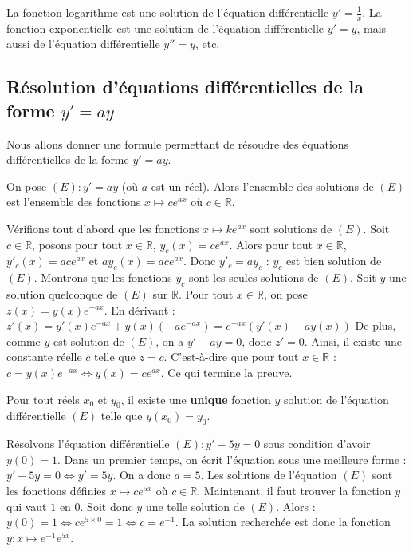 	\begin{tip}[Exemple]
		La fonction logarithme est une solution de l'équation différentielle $y' = \frac{1}{x}$.
		\newpar
		La fonction exponentielle est une solution de l'équation différentielle $y' = y$, mais aussi de l'équation différentielle $y'' = y$, etc.
	\end{tip}

	\subsection{Résolution d'équations différentielles de la forme $y'=ay$}

	Nous allons donner une formule permettant de résoudre des équations différentielles de la forme $y' = ay$.

	\begin{formula}[Formule]
		On pose $(E) : y'=ay$ (où $a$ est un réel). Alors l'ensemble des solutions de $(E)$ est l'ensemble des fonctions $x \mapsto c e^{ax}$ où $c \in \mathbb{R}$.
	\end{formula}

	\begin{demonstration}
		Vérifions tout d'abord que les fonctions $x \mapsto k e^{ax}$ sont solutions de $(E)$. Soit $c \in \mathbb{R}$, posons pour tout $x \in \mathbb{R}$, $y_c(x) = c e^{ax}$.
		\newpar
		Alors pour tout $x \in \mathbb{R}$, $y'_c(x) = ac e^{ax}$ et $ay_c(x) = ac e^{ax}$. Donc $y'_c = a y_c$ : $y_c$ est bien solution de $(E)$.
		\newpar
		Montrons que les fonctions $y_c$ sont les seules solutions de $(E)$. Soit $y$ une solution quelconque de $(E)$ sur $\mathbb{R}$. Pour tout $x \in \mathbb{R}$, on pose $z(x) = y(x) e^{-ax}$. En dérivant :
		\newpar
		$z'(x) = y'(x) e^{-ax} + y(x) (-ae^{-ax}) = e^{-ax}(y'(x) - ay(x))$
		\newpar
		De plus, comme $y$ est solution de $(E)$, on a $y' - ay = 0$, donc $z' = 0$.
		\newpar
		Ainsi, il existe une constante réelle $c$ telle que $z = c$. C'est-à-dire que pour tout $x \in \mathbb{R}$ :
		\newpar
		$c = y(x) e^{-ax} \iff y(x) = c e^{ax}$. Ce qui termine la preuve.
	\end{demonstration}

	\begin{formula}[Théorème]
		Pour tout réels $x_0$ et $y_0$, il existe une \textbf{unique} fonction $y$ solution de l'équation différentielle $(E)$ telle que $y(x_0) = y_0$.
	\end{formula}

	\begin{tip}[Exemple]
		Résolvons l'équation différentielle $(E) : y' - 5y = 0$ sous condition d'avoir $y(0) = 1$.
		\newpar
		Dans un premier temps, on écrit l'équation sous une meilleure forme : $y' - 5y = 0 \iff y' = 5y$. On a donc $a = 5$. Les solutions de l'équation $(E)$ sont les fonctions définies $x \mapsto c e^{5x}$ où $c \in \mathbb{R}$.
		\newpar
		Maintenant, il faut trouver la fonction $y$ qui vaut $1$ en $0$. Soit donc $y$ une telle solution de $(E)$. Alors :
		\newpar
		$y(0) = 1 \iff c e^{5 \times 0} = 1 \iff c = e^{-1}$. La solution recherchée est donc la fonction $y : x \mapsto e^{-1} e^{5x}$.
	\end{tip}

